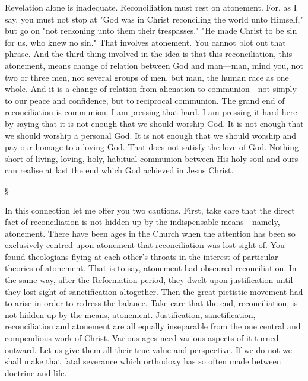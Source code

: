 \documentclass[12pt,letterpaper,oneside]{book}
\begin{document}
Revelation alone is inadequate. Reconciliation 
must rest on atonement. For, as I say, 
you must not stop at "God was in Christ 
reconciling the world unto Himself," but go on 
"not reckoning unto them their trespasses." 
"He made Christ to be sin for us, who knew 
no sin." That involves atonement. You cannot 
blot out that phrase. And the third thing 
involved in the idea is that this reconciliation, 
this atonement, means change of relation between 
God and man---man, mind you, not two 
or three men, not several groups of men, 
but man, the human race as one whole. And it 
is a change of relation from alienation to communion---not 
simply to our peace and confidence, 
but to reciprocal communion. The grand end of 
reconciliation is communion. I am pressing 
that hard. I am pressing it hard here by 
saying that it is not enough that we should 
worship God. It is not enough that we should 
worship a personal God. It is not enough that 
we should worship and pay our homage to a 
loving God. That does not satisfy the love of 
God. Nothing short of living, loving, holy, 
habitual communion between His holy soul and 
ours can realise at last the end which God 
achieved in Jesus Christ. 

\begin{center}
\S
\end{center}

In this connection let me offer you two 
cautions. First, take care that the direct fact 
of reconciliation is not hidden up by the indispensable 
means---namely, atonement. There 
have been ages in the Church when the 
attention has been so exclusively centred upon 
atonement that reconciliation was lost sight 
of. You found theologians flying at each 
other's throats in the interest of particular 
theories of atonement. That is to say, atonement 
had obscured reconciliation. In the same 
way, after the Reformation period, they dwelt 
upon justification until they lost sight of 
sanctification altogether. Then the great 
pietistic movement had to arise in order to 
redress the balance. Take care that the end, 
reconciliation, is not hidden up by the means, 
atonement. Justification, sanctification, reconciliation 
and atonement are all equally inseparable 
from the one central and compendious 
work of Christ. Various ages need various 
aspects of it turned outward. Let us give 
them all their true value and perspective. If 
we do not we shall make that fatal severance 
which orthodoxy has so often made between 
doctrine and life. 
\end{document}

